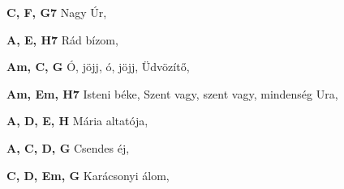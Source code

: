 \begin{multicols}{2}
\begin{minipage}{\textwidth}
\end{minipage}
\begin{minipage}{\textwidth}
\textbf{C, F, G7}\newline
\textbullet\hspace{1 mm}Nagy Úr, \pageref{NagyC39Ar}\newline

\end{minipage}
\begin{minipage}{\textwidth}
\textbf{A, E, H7}\newline
\textbullet\hspace{1 mm}Rád bízom, \pageref{RC3A1dbC3ADzom}\newline

\end{minipage}
\begin{minipage}{\textwidth}
\textbf{Am, C, G}\newline
\textbullet\hspace{1 mm}Ó, jöjj, ó, jöjj, Üdvözítő, \pageref{C3932CjC3B6jj2CC3B32CjC3B6jj2CC39CdvC3B6zC3ADtC591}\newline

\end{minipage}
\begin{minipage}{\textwidth}
\textbf{Am, Em, H7}\newline
\textbullet\hspace{1 mm}Isteni béke, \pageref{IstenibC3A9ke}\newline
\textbullet\hspace{1 mm}Szent vagy, szent vagy, mindenség Ura, \pageref{Szentvagy2Cszentvagy2CmindensC3A9gUra}\newline

\end{minipage}
\begin{minipage}{\textwidth}
\textbf{A, D, E, H}\newline
\textbullet\hspace{1 mm}Mária altatója, \pageref{MC3A1riaaltatC3B3ja}\newline

\end{minipage}
\begin{minipage}{\textwidth}
\textbf{A, C, D, G}\newline
\textbullet\hspace{1 mm}Csendes éj, \pageref{CsendesC3A9j}\newline

\end{minipage}
\begin{minipage}{\textwidth}
\textbf{C, D, Em, G}\newline
\textbullet\hspace{1 mm}Karácsonyi álom, \pageref{KarC3A1csonyiC3A1lom}\newline


\end{minipage}
\end{multicols}
